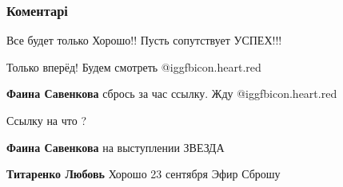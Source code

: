  
 
 
 
 
\subsubsection{Коментарі}

\begin{itemize} %
Все будет только Хорошо!! Пусть сопутствует УСПЕХ!!!

Только вперёд! Будем смотреть  @igg{fbicon.heart.red}

\textbf{Фаина Савенкова} сбрось за час ссылку. Жду @igg{fbicon.heart.red}

\begin{itemize} %
Ссылку на что ?

\textbf{Фаина Савенкова} на выступлении ЗВЕЗДА

\textbf{Титаренко Любовь} Хорошо 23 сентября Эфир Сброшу
\end{itemize} %

\end{itemize} %

